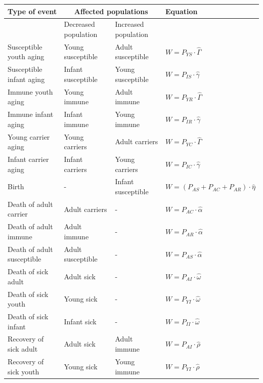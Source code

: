 \documentclass[10pt,a4paper]{article}
\begin{document}
\begin{appendices}
\begin{longtable}{p{3.5cm}|l|l|p{4cm}}
	Type of event						& \multicolumn{2}{|c|}{Affected populations}		& Equation															\\ \hline
										& Decreased population	& Increased population		&																	\\ \hline
	Susceptible youth aging				& Young susceptible		& Adult susceptible			& $W = P_{YS} \cdot \hat{\Gamma}$										\\ \hline
	Susceptible infant aging			& Infant susceptible	& Young susceptible			& $W = P_{IS} \cdot \hat{\gamma}$										\\ \hline
	Immune youth aging					& Young immune			& Adult immune				& $W = P_{YR} \cdot \hat{\Gamma}$										\\ \hline
	Immune infant aging					& Infant immune			& Young immune				& $W = P_{IR} \cdot \hat{\gamma}$										\\ \hline
	Young carrier aging					& Young carriers		& Adult carriers			& $W = P_{YC} \cdot \hat{\Gamma}$										\\ \hline
	Infant carrier aging				& Infant carriers		& Young carriers			& $W = P_{IC} \cdot \hat{\gamma}$										\\ \hline
	Birth								& -						& Infant susceptible		& $W = \left( P_{AS} + P_{AC} + P_{AR} \right) \cdot \hat{\eta}$		\\ \hline
	Death of adult carrier				& Adult carriers		& - 						& $W = P_{AC} \cdot \hat{\alpha}$										\\ \hline
	Death of adult immune				& Adult immune			& - 						& $W = P_{AR} \cdot \hat{\alpha}$										\\ \hline
	Death of adult susceptible			& Adult susceptible		& -							& $W = P_{AS} \cdot \hat{\alpha}$										\\ \hline
	Death of sick adult					& Adult sick			& -							& $W = P_{AI} \cdot \hat{\omega}$										\\ \hline
	Death of sick youth					& Young sick			& -							& $W = P_{YI} \cdot \hat{\omega}$										\\ \hline
	Death of sick infant				& Infant sick			& -							& $W = P_{II} \cdot \hat{\omega}$										\\ \hline
	Recovery of sick adult				& Adult sick			& Adult immune				& $W = P_{AI} \cdot \hat{\rho}$										\\ \hline
	Recovery of sick youth				& Young sick			& Young immune				& $W = P_{YI} \cdot \hat{\rho}$										\\ \hline

\end{longtable}
\end{appendices}
\end{document}
